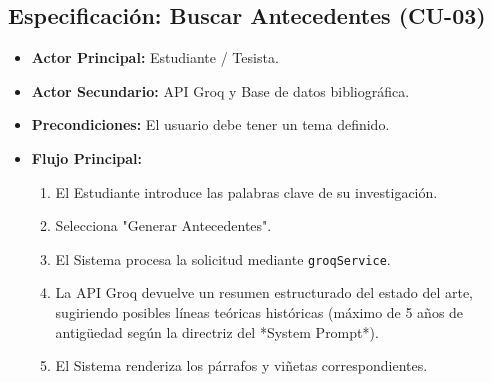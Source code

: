\subsection{Especificación: Buscar Antecedentes (CU-03)}
\begin{itemize}
    \item \textbf{Actor Principal:} Estudiante / Tesista.
    \item \textbf{Actor Secundario:} API Groq y Base de datos bibliográfica.
    \item \textbf{Precondiciones:} El usuario debe tener un tema definido.
    \item \textbf{Flujo Principal:}
    \begin{enumerate}
        \item El Estudiante introduce las palabras clave de su investigación.
        \item Selecciona "Generar Antecedentes".
        \item El Sistema procesa la solicitud mediante \texttt{groqService}.
        \item La API Groq devuelve un resumen estructurado del estado del arte, sugiriendo posibles líneas teóricas históricas (máximo de 5 años de antigüedad según la directriz del *System Prompt*).
        \item El Sistema renderiza los párrafos y viñetas correspondientes.
    \end{enumerate}
\end{itemize}
